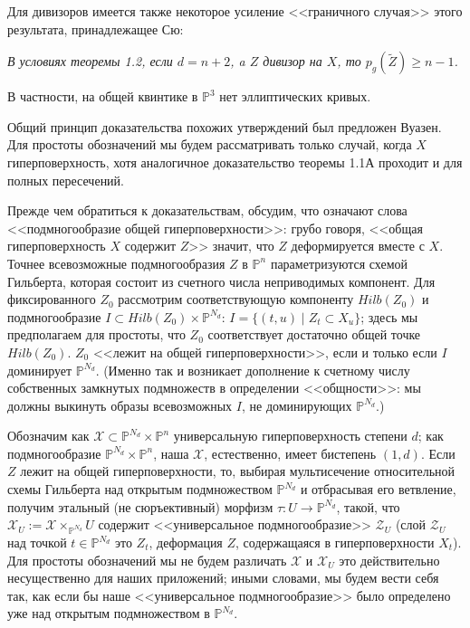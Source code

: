 Для дивизоров имеется также некоторое усиление <<граничного случая>>
этого результата, принадлежащее Сю:

\medskip
\textit{В условиях теоремы \textup{1.2}, если $d=n+2$, a $Z$ дивизор на $X$, то
$p_g(\tilde{Z})\geq n-1$.}

\medskip
В частности, на общей квинтике в $\mathbb{P}^3$ нет эллиптических кривых.

Общий принцип доказательства похожих утверждений был предложен Вуазен.
Для простоты обозначений мы будем рассматривать только случай, когда $X$
гиперповерхность, хотя аналогичное доказательство теоремы 1.1А проходит и для полных
пересечений.

Прежде чем обратиться к доказательствам, обсудим, что означают слова
<<подмногообразие общей гиперповерхности>>: грубо говоря,
<<общая гиперповерхность $X$
содержит $Z$>> значит, что $Z$ деформируется вместе с $X$. Точнее
всевозможные подмногообразия $Z$ в $\mathbb{P}^n$ параметризуются схемой Гильберта,
которая состоит из счетного числа неприводимых компонент. Для фиксированного
$Z_0$ рассмотрим соответствующую компоненту $Hilb(Z_0)$ и подмногообразие
$I\subset Hilb(Z_0)\times \mathbb{P}^{N_d}$: $I=\{(t,u)\mid Z_t\subset X_u\}$; здесь мы
предполагаем для простоты, что $Z_0$ соответствует достаточно общей точке
$Hilb(Z_0)$. $Z_0$ <<лежит
на общей гиперповерхности>>, если и только если $I$ доминирует $\mathbb{P}^{N_d}$.
(Именно так и возникает дополнение к счетному числу собственных замкнутых
подмножеств в определении <<общности>>: мы должны выкинуть образы
всевозможных $I$, не доминирующих $\mathbb{P}^{N_d}$.)

Обозначим как $\mathcal{X}\subset \mathbb{P}^{N_d}\times \mathbb{P}^n$ универсальную гиперповерхность
степени $d$; как подмногообразие $\mathbb{P}^{N_d}\times \mathbb{P}^n$, наша $\mathcal{X}$, естественно, имеет бистепень $(1,d)$.
Если $Z$ лежит на общей гиперповерхности, то, выбирая мультисечение
относительной схемы Гильберта над открытым подмножеством $\mathbb{P}^{N_d}$ и отбрасывая его ветвление,
получим этальный (не сюръективный) морфизм $\tau\colon U\rightarrow \mathbb{P}^{N_d}$,
такой, что $\mathcal{X}_U:=\mathcal{X}\times_{\mathbb{P}^{N_d}} U$ содержит <<универсальное
подмногообразие>> $\mathcal{Z}_U$ (слой $\mathcal{Z}_U$ над точкой $t\in \mathbb{P}^{N_d}$
это $Z_t$, деформация $Z$, содержащаяся в гиперповерхности $X_t$).
Для простоты обозначений мы не будем различать $\mathcal{X}$ и $\mathcal{X}_U$ это
действительно несущественно для наших приложений; иными словами,
мы будем вести себя так, как если бы наше <<универсальное подмногообразие>>
было определено уже над открытым подмножеством в $\mathbb{P}^{N_d}$.

